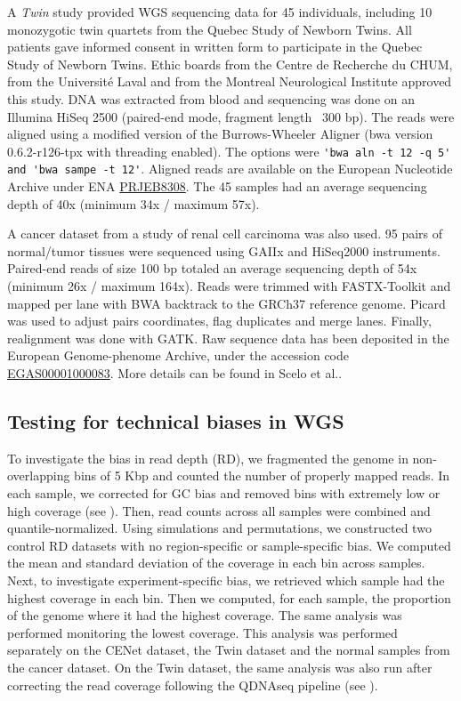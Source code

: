 A {\it Twin} study provided WGS sequencing data for 45 individuals, including 10 monozygotic twin quartets from the Quebec Study of Newborn Twins\cite{Boivin2013}.
All patients gave informed consent in written form to participate in the Quebec Study of Newborn Twins. Ethic boards from the Centre de Recherche du CHUM, from the Universit\'e Laval and from the Montreal Neurological Institute approved this study.
DNA was extracted from blood and sequencing was done on an Illumina HiSeq 2500 (paired-end mode, fragment length ~300 bp).
The reads were aligned using a modified version of the Burrows-Wheeler Aligner\cite{Li2010} (bwa version 0.6.2-r126-tpx with threading enabled).
The options were \verb!'bwa aln -t 12 -q 5' and 'bwa sampe -t 12'!.
Aligned reads are available on the European Nucleotide Archive under ENA \href{https://www.ebi.ac.uk/ena/data/view/PRJEB8308}{PRJEB8308}.
The 45 samples had an average sequencing depth of 40x (minimum 34x / maximum 57x).

A cancer dataset from a study of renal cell carcinoma\cite{Scelo2014} was also used.
95 pairs of normal/tumor tissues were sequenced using GAIIx and HiSeq2000 instruments.
Paired-end reads of size 100 bp totaled an average sequencing depth of 54x (minimum 26x / maximum 164x).
Reads were trimmed with FASTX-Toolkit and mapped per lane with {\sf BWA}\cite{Li2010} backtrack to the GRCh37 reference genome.
Picard was used to adjust pairs coordinates, flag duplicates and merge lanes.
Finally, realignment was done with {\sf GATK}.
Raw sequence data has been deposited in the European Genome-phenome Archive, under the accession code \href{https://www.ebi.ac.uk/ega/studies/EGAS00001000083}{EGAS00001000083}.
More details can be found in Scelo et al.\cite{Scelo2014}.

\subsection*{Testing for technical biases in WGS}
To investigate the bias in read depth (RD), we fragmented the genome in non-overlapping bins of 5 Kbp and counted the number of properly mapped reads. 
In each sample, we corrected for GC bias and removed bins with extremely low or high coverage (see ). 
Then, read counts across all samples were combined and quantile-normalized. 
Using simulations and permutations, we constructed two control RD datasets with no region-specific or sample-specific bias. 
We computed the mean and standard deviation of the coverage in each bin across samples. 
Next, to investigate experiment-specific bias, we retrieved which sample had the highest coverage in each bin. 
Then we computed, for each sample, the proportion of the genome where it had the highest coverage. 
The same analysis was performed monitoring the lowest coverage. 
This analysis was performed separately on the CENet dataset, the Twin dataset and the normal samples from the cancer dataset.
On the Twin dataset, the same analysis was also run after correcting the read coverage following the {\sf QDNAseq} pipeline\cite{Scheinin2014} (see ).

